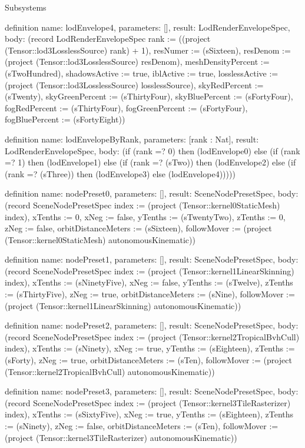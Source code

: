 \begin{lexlean}{Subsystems}
\begin{semanticmodule}
definition{
  name: lodEnvelope4,
  parameters: [],
  result: LodRenderEnvelopeSpec,
  body: (record LodRenderEnvelopeSpec {rank := ((project (Tensor::lod3LosslessSource) rank) + 1), resNumer := (sSixteen), resDenom := (project (Tensor::lod3LosslessSource) resDenom), meshDensityPercent := (sTwoHundred), shadowsActive := true, iblActive := true, losslessActive := (project (Tensor::lod3LosslessSource) losslessSource), skyRedPercent := (sTwenty), skyGreenPercent := (sThirtyFour), skyBluePercent := (sFortyFour), fogRedPercent := (sThirtyFour), fogGreenPercent := (sFortyFour), fogBluePercent := (sFortyEight)})
}

definition{
  name: lodEnvelopeByRank,
  parameters: [rank : Nat],
  result: LodRenderEnvelopeSpec,
  body: (if (rank =? 0) then (lodEnvelope0) else (if (rank =? 1) then (lodEnvelope1) else (if (rank =? (sTwo)) then (lodEnvelope2) else (if (rank =? (sThree)) then (lodEnvelope3) else (lodEnvelope4)))))
}

definition{
  name: nodePreset0,
  parameters: [],
  result: SceneNodePresetSpec,
  body: (record SceneNodePresetSpec {index := (project (Tensor::kernel0StaticMesh) index), xTenths := 0, xNeg := false, yTenths := (sTwentyTwo), zTenths := 0, zNeg := false, orbitDistanceMeters := (sSixteen), followMover := (project (Tensor::kernel0StaticMesh) autonomousKinematic)})
}

definition{
  name: nodePreset1,
  parameters: [],
  result: SceneNodePresetSpec,
  body: (record SceneNodePresetSpec {index := (project (Tensor::kernel1LinearSkinning) index), xTenths := (sNinetyFive), xNeg := false, yTenths := (sTwelve), zTenths := (sThirtyFive), zNeg := true, orbitDistanceMeters := (sNine), followMover := (project (Tensor::kernel1LinearSkinning) autonomousKinematic)})
}

definition{
  name: nodePreset2,
  parameters: [],
  result: SceneNodePresetSpec,
  body: (record SceneNodePresetSpec {index := (project (Tensor::kernel2TropicalBvhCull) index), xTenths := (sNinety), xNeg := true, yTenths := (sEighteen), zTenths := (sForty), zNeg := true, orbitDistanceMeters := (sTen), followMover := (project (Tensor::kernel2TropicalBvhCull) autonomousKinematic)})
}

definition{
  name: nodePreset3,
  parameters: [],
  result: SceneNodePresetSpec,
  body: (record SceneNodePresetSpec {index := (project (Tensor::kernel3TileRasterizer) index), xTenths := (sSixtyFive), xNeg := true, yTenths := (sEighteen), zTenths := (sNinety), zNeg := false, orbitDistanceMeters := (sTen), followMover := (project (Tensor::kernel3TileRasterizer) autonomousKinematic)})
}


\end{semanticmodule}
\end{lexlean}
